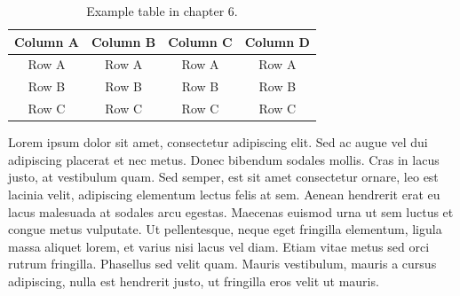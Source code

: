 \vspace{6pt} %
\begin{table}[!ht]
\centering
\setlength{\tabcolsep}{14pt}
\caption{Example table in chapter 6.}
\label{table:ch6-1}
\begin{tabular}{cccc}
\toprule\midrule
Column A & Column B & Column C & Column D \\
\midrule
Row A & Row A & Row A & Row A \\
Row B & Row B & Row B & Row B \\
Row C & Row C & Row C & Row C \\
\bottomrule
\end{tabular}
\end{table}
\vspace{-6pt} %

Lorem ipsum dolor sit amet, consectetur adipiscing elit. Sed ac augue vel dui  adipiscing placerat et nec metus. Donec bibendum sodales mollis. Cras in lacus   justo, at vestibulum quam. Sed semper, est sit amet consectetur ornare, leo est  lacinia velit, adipiscing elementum lectus felis at sem. Aenean hendrerit erat eu  lacus malesuada at sodales arcu egestas. Maecenas euismod urna ut sem luctus et  congue metus vulputate. Ut pellentesque, neque eget fringilla elementum, ligula  massa aliquet lorem, et varius nisi lacus vel diam. Etiam vitae metus sed orci  rutrum fringilla. Phasellus sed velit quam. Mauris vestibulum, mauris a cursus  adipiscing, nulla est hendrerit justo, ut fringilla eros velit ut mauris.